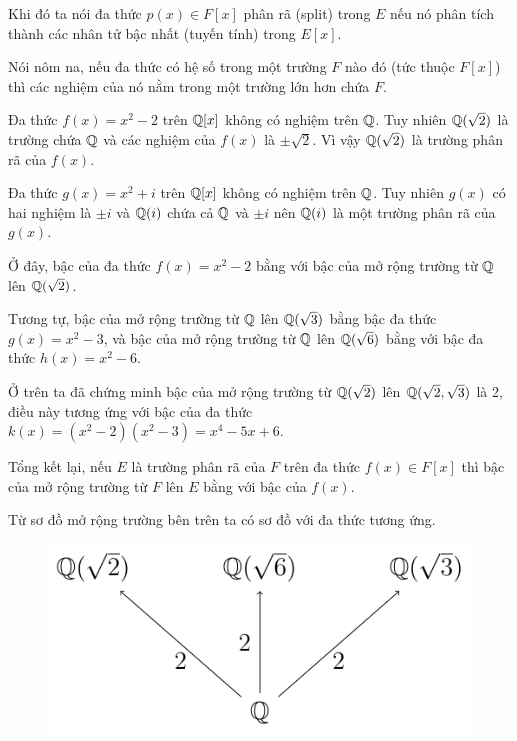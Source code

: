 Khi đó ta nói đa thức $p(x) \in F[x]$ phân rã (split) trong $E$ nếu nó phân tích thành các nhân tử bậc nhất (tuyến tính) trong $E[x]$.

Nói nôm na, nếu đa thức có hệ số trong một trường $F$ nào đó (tức thuộc $F[x]$) thì các nghiệm của nó nằm trong một trường lớn hơn chứa $F$.

\begin{example}
    Đa thức $f(x) = x^2 - 2$ trên $\mathbb{Q}[x]$ không có nghiệm trên $\mathbb{Q}$. Tuy nhiên $\mathbb{Q}(\sqrt{2})$ là trường chứa $\mathbb{Q}$ và các nghiệm của $f(x)$ là $\pm \sqrt{2}$. Vì vậy $\mathbb{Q}(\sqrt{2})$ là trường phân rã của $f(x)$.
\end{example}

\begin{example}
    Đa thức $g(x) = x^2 + i$ trên $\mathbb{Q}[x]$ không có nghiệm trên $\mathbb{Q}$. Tuy nhiên $g(x)$ có hai nghiệm là $\pm i$ và $\mathbb{Q}(i)$ chứa cả $\mathbb{Q}$ và $\pm i$ nên $\mathbb{Q}(i)$ là một trường phân rã của $g(x)$.
\end{example}

Ở đây, bậc của đa thức $f(x) = x^2 - 2$ bằng với bậc của mở rộng trường từ $\mathbb{Q}$ lên $\mathbb{Q}(\sqrt{2})$.

Tương tự, bậc của mở rộng trường từ $\mathbb{Q}$ lên $\mathbb{Q}(\sqrt{3})$ bằng bậc đa thức $g(x) = x^2 - 3$, và bậc của mở rộng trường từ $\mathbb{Q}$ lên $\mathbb{Q}(\sqrt{6})$ bằng với bậc đa thức $h(x) = x^2 - 6$.

Ở trên ta đã chứng minh bậc của mở rộng trường từ $\mathbb{Q}(\sqrt{2})$ lên $\mathbb{Q}(\sqrt{2}, \sqrt{3})$ là 2, điều này tương ứng với bậc của đa thức $k(x) = (x^2 - 2)(x^2 - 3) = x^4 - 5 x + 6$.

Tổng kết lại, nếu $E$ là trường phân rã của $F$ trên đa thức $f(x) \in F[x]$ thì bậc của mở rộng trường từ $F$ lên $E$ bằng với bậc của $f(x)$.

Từ sơ đồ mở rộng trường bên trên ta có sơ đồ với đa thức tương ứng.

\begin{figure}[htb]
    \centering
    \includegraphics[page=3]{figures/extension_field.pdf}
\end{figure}

